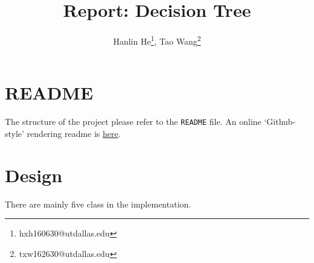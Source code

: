 \documentclass[12pt, letterpaper]{article}
\title{Report: Decision Tree}
\author{Hanlin He\footnote{hxh160630@utdallas.edu},
Tao Wang\footnote{txw162630@utdallas.edu}}
\begin{document}
\maketitle

\section*{README}

The structure of the project please refer to the \texttt{README} file. An online `Github-style' rendering readme is \href{https://cs6375.github.io/DecisionTree/}{here}.

\section{Design}

There are mainly five class in the implementation.
\end{document}
